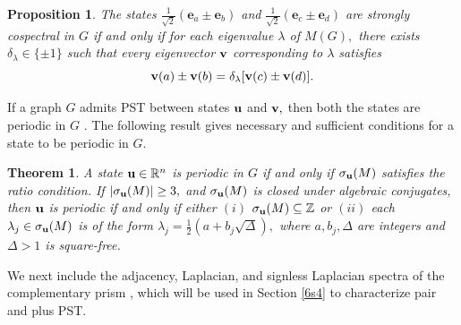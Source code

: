 \documentclass[12pt,a4paper]{article}
\newtheorem{thm}{Theorem}
\newtheorem{prop}{Proposition}
\def \e {{\bf e}}
\def \u {{\bf u}}
\def \v {{\bf v}}
\def \e {{\mathbf e}}
\newcommand{\ob}[1]{\left(#1\right)}
\begin{document}
\begin{prop}\label{6p2}
     The states $\frac{1}{\sqrt{2}}\ob{\e_a\pm\e_b}$ and $\frac{1}{\sqrt{2}}\ob{\e_c\pm\e_d}$ are strongly cospectral in $G$ if and only if for each eigenvalue $\lambda$ of $M(G),$ there exists $\delta_\lambda\in\{\pm 1\}$ such that every eigenvector $\v$ corresponding to $\lambda$ satisfies 
     \[\v(a)\pm\v(b)=\delta_\lambda[\v(c)\pm\v(d)].\]
 \end{prop}
 If a graph $G$ admits PST between states $\u$ and $\v,$ then both the states are periodic in $G$ \cite[Lemma 5.1]{god7}. The following result gives necessary and sufficient conditions for a state to be periodic in $G.$ 
 \begin{thm}\label{6t3}\cite{god7}
     A state $\u\in\mathbb{R}^n$ is periodic in $G$ if and only if $\sigma_\u(M)$ satisfies the ratio condition. If $|\sigma_\u(M)|\geq 3,$ and $\sigma_\u(M)$ is closed under algebraic conjugates,  then $\u$ is periodic if and only if either  $(i)$ $ \sigma_\u(M)\subseteq \mathbb{Z}$ or $(ii)$ each $\lambda_j\in \sigma_\u(M)$
      is of the form $\lambda_j=\frac{1}{2}(a+b_j\sqrt{\Delta}),$ where $a,b_j,\Delta$ are integers and $\Delta>1$ is square-free.
 \end{thm}

We next include the adjacency, Laplacian, and signless Laplacian spectra of the complementary prism \cite{card1}, which will be used in Section \ref{6s4} to characterize pair and plus PST. 
\end{document}
